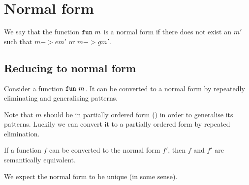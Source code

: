 \section{Normal form}
We say that the function $\texttt{fun}\  m$ is a normal form if there does not exist an
$m'$ such that $m ->e m'$ or $m ->g m'$.

\subsection{Reducing to normal form}
Consider a function $\texttt{fun}\  m$. It can be converted to a normal form by repeatedly
eliminating and generalising patterns.

Note that $m$ should be in partially ordered form () in
order to generalise its patterns. Luckily we can convert it to a partially
ordered form by repeated elimination.

\begin{lemma}
  If a function $f$ can be converted to the normal form $f'$, then $f$ and $f'$
  are semantically equivalent.
\end{lemma}

\begin{lemma}
  We expect the normal form to be unique (in some sense).
\end{lemma}

